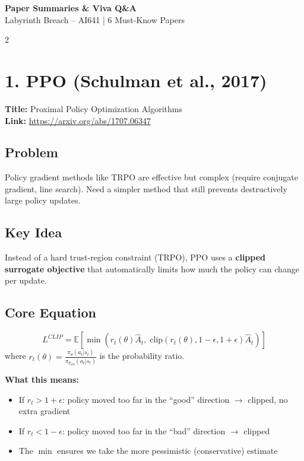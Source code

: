 \documentclass[10pt,a4paper]{article}
\begin{document}
\begin{center}
{\LARGE\bfseries Paper Summaries \& Viva Q\&A} \\[3pt]
{\normalsize Labyrinth Breach -- AI641 | 6 Must-Know Papers}
\end{center}

\begin{multicols}{2}

\section{1. PPO (Schulman et al., 2017)}

\textbf{Title:} Proximal Policy Optimization Algorithms \\
\textbf{Link:} \url{https://arxiv.org/abs/1707.06347}

\subsection{Problem}
Policy gradient methods like TRPO are effective but complex (require conjugate gradient, line search). Need a simpler method that still prevents destructively large policy updates.

\subsection{Key Idea}
Instead of a hard trust-region constraint (TRPO), PPO uses a \textbf{clipped surrogate objective} that automatically limits how much the policy can change per update.

\subsection{Core Equation}
\[
L^{CLIP} = \mathbb{E}\left[\min\left(r_t(\theta)\hat{A}_t,\; \text{clip}(r_t(\theta), 1{-}\epsilon, 1{+}\epsilon)\hat{A}_t\right)\right]
\]
where $r_t(\theta) = \frac{\pi_\theta(a_t|s_t)}{\pi_{\theta_{old}}(a_t|s_t)}$ is the probability ratio.

\textbf{What this means:}
\begin{itemize}
\item If $r_t > 1{+}\epsilon$: policy moved too far in the ``good'' direction $\rightarrow$ clipped, no extra gradient
\item If $r_t < 1{-}\epsilon$: policy moved too far in the ``bad'' direction $\rightarrow$ clipped
\item The $\min$ ensures we take the more pessimistic (conservative) estimate
\end{itemize}


\end{multicols}
\end{document}
